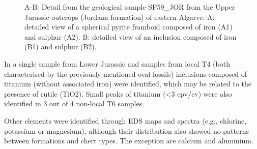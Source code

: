 \documentclass[
  a4paper,
  DIV=11,
  numbers=noendperiod]{scrreprt}
\begin{document}
\begin{figure}


\caption{\label{fig-framboids}A-B: Detail from the geological sample
SP59\_JOR from the Upper Jurassic outcrops (Jordana formation) of
eastern Algarve. A: detailed view of a spherical pyrite framboid
composed of iron (A1) and sulphur (A2). B: detailed view of an inclusion
composed of iron (B1) and sulphur (B2).}

\end{figure}%

In a single sample from Lower Jurassic and samples from local T4 (both
characterised by the previously mentioned oval fossils) inclusions
composed of titanium (without associated iron) were identified, which
may be related to the presence of rutile (TiO2). Small peaks of titanium
(\textless3 cpv/ev) were also identified in 3 out of 4 non-local T6
samples.

Other elements were identified through EDS maps and spectra (e.g.,
chlorine, potassium or magnesium), although their distribution also
showed no patterns between formations and chert types. The exception are
calcium and aluminium.
\end{document}
